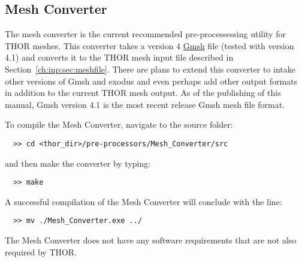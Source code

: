 \subsection{Mesh Converter}\label{ch:getstart:sec:preproc:subsec:meshconv}

The mesh converter is the current recommended pre-processessing utility for \ac{THOR} meshes.
This converter takes a version 4 \href{https://gmsh.info/}{Gmsh} file (tested with version 4.1) and converts it to the \ac{THOR} mesh input file described in Section~\ref{ch:inp:sec:meshfile}.
There are plans to extend this converter to intake other versions of Gmsh and exodus and even perhaps add other output formats in addition to the current \ac{THOR} mesh output.
As of the publishing of this manual, Gmsh version 4.1 is the most recent release Gmsh mesh file format.

To compile the Mesh Converter, navigate to the source folder:
\begin{verbatim}
  >> cd <thor_dir>/pre-processors/Mesh_Converter/src
\end{verbatim}
and then make the converter by typing:
\begin{verbatim}
  >> make
\end{verbatim}
A successful compilation of the Mesh Converter will conclude with the line:
\begin{verbatim}
  >> mv ./Mesh_Converter.exe ../
\end{verbatim}
The Mesh Converter does not have any software requirements that are not also required by \ac{THOR}.

